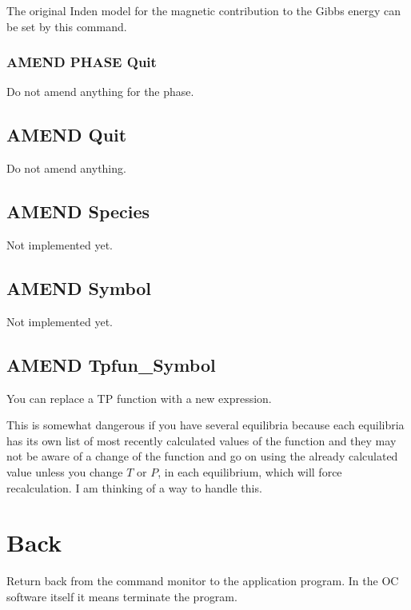 \documentclass[12pt]{article}
\begin{document}
The original Inden model for the magnetic contribution to the Gibbs
energy can be set by this command.

\subsubsection{AMEND PHASE Quit}

Do not amend anything for the phase.

\subsection{AMEND Quit}

Do not amend anything.

\subsection{AMEND Species}

Not implemented yet.

\subsection{AMEND Symbol}

Not implemented yet.

\subsection{AMEND Tpfun\_Symbol}

You can replace a TP function with a new expression.

This is somewhat dangerous if you have several equilibria because each
equilibria has its own list of most recently calculated values of the
function and they may not be aware of a change of the function and go
on using the already calculated value unless you change $T$ or $P$, in
each equilibrium, which will force recalculation.  I am thinking of a
way to handle this.

\section{Back }

Return back from the command monitor to the application program.  In
the OC software itself it means terminate the program.
\end{document}

